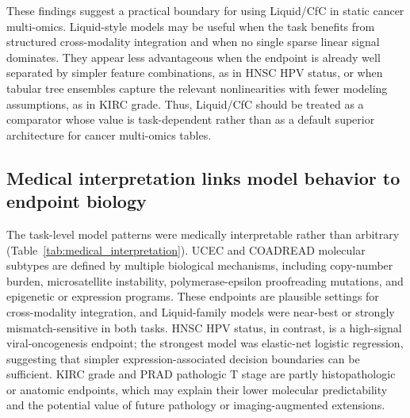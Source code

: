 \begin{table}[ht]
\centering
\caption{Task-level interpretation of Liquid/CfC and small-Liquid/CfC performance. Delta values are relative to the best 10-fold mean macro F1 model for each task.}
\label{tab:liquid_applicability}
\end{table}

These findings suggest a practical boundary for using Liquid/CfC in static cancer multi-omics. Liquid-style models may be useful when the task benefits from structured cross-modality integration and when no single sparse linear signal dominates. They appear less advantageous when the endpoint is already well separated by simpler feature combinations, as in HNSC HPV status, or when tabular tree ensembles capture the relevant nonlinearities with fewer modeling assumptions, as in KIRC grade. Thus, Liquid/CfC should be treated as a comparator whose value is task-dependent rather than as a default superior architecture for cancer multi-omics tables.

\subsection{Medical interpretation links model behavior to endpoint biology}

The task-level model patterns were medically interpretable rather than arbitrary (Table~\ref{tab:medical_interpretation}). UCEC and COADREAD molecular subtypes are defined by multiple biological mechanisms, including copy-number burden, microsatellite instability, polymerase-epsilon proofreading mutations, and epigenetic or expression programs. These endpoints are plausible settings for cross-modality integration, and Liquid-family models were near-best or strongly mismatch-sensitive in both tasks. HNSC HPV status, in contrast, is a high-signal viral-oncogenesis endpoint; the strongest model was elastic-net logistic regression, suggesting that simpler expression-associated decision boundaries can be sufficient. KIRC grade and PRAD pathologic T stage are partly histopathologic or anatomic endpoints, which may explain their lower molecular predictability and the potential value of future pathology or imaging-augmented extensions.

